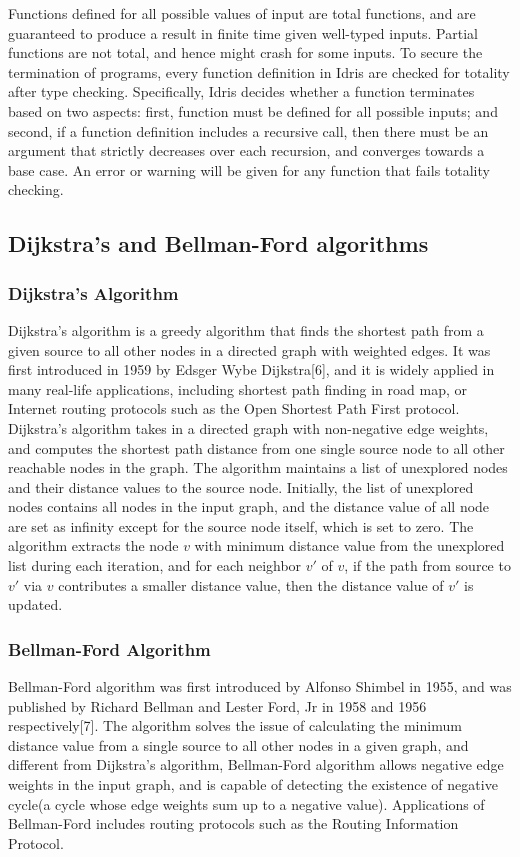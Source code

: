 Functions defined for all possible values of input are total functions, and are guaranteed to produce a result in finite time given well-typed inputs. Partial functions are not total, and hence might crash for some inputs. To secure the termination of programs, every function definition in Idris are checked for totality after type checking. Specifically, Idris decides whether a function terminates based on two aspects: first, function must be defined for all possible inputs; and second, if a function definition includes a recursive call, then there must be an argument that strictly decreases over each recursion, and converges towards a base case. An error or warning will be given for any function that fails totality checking. 

\subsection{Dijkstra's and Bellman-Ford algorithms}
\subsubsection*{Dijkstra's Algorithm}
Dijkstra's algorithm is a greedy algorithm that finds the shortest path from a given source to all other nodes in a directed graph with weighted edges. It was first introduced in 1959 by Edsger Wybe Dijkstra[6], and it is widely applied in many real-life applications, including shortest path finding in road map, or Internet routing protocols such as the Open Shortest Path First protocol. 
\\

Dijkstra's algorithm takes in a directed graph with non-negative edge weights, and computes the shortest path distance from one single source node to all other reachable nodes in the graph. The algorithm maintains a list of unexplored nodes and their distance values to the source node. Initially, the list of unexplored nodes contains all nodes in the input graph, and the distance value of all node are set as infinity except for the source node itself, which is set to zero. The algorithm extracts the node $v$ with minimum distance value from the unexplored list during each iteration, and for each neighbor $v'$ of $v$, if the path from source to $v'$ via $v$ contributes a smaller distance value, then the distance value of $v'$ is updated. 

\subsubsection*{Bellman-Ford Algorithm}
Bellman-Ford algorithm was first introduced by Alfonso Shimbel in 1955, and was published by Richard Bellman and Lester Ford, Jr in 1958 and 1956 respectively[7]. The algorithm solves the issue of calculating the minimum distance value from a single source to all other nodes in a given graph, and different from Dijkstra's algorithm, Bellman-Ford algorithm allows negative edge weights in the input graph, and is capable of detecting the existence of negative cycle(a cycle whose edge weights sum up to a negative value). Applications of Bellman-Ford includes routing protocols such as the Routing Information Protocol. 